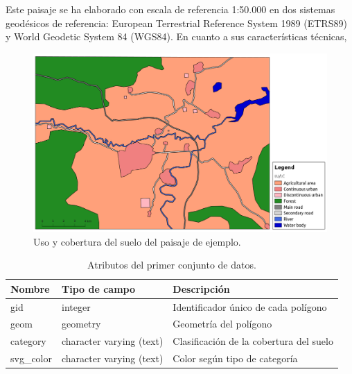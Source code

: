 Este paisaje se ha elaborado con escala de referencia 1:50.000 en dos sistemas geodésicos de referencia: European Terrestrial Reference System 1989 (ETRS89) y World Geodetic System 84 (WGS84). En cuanto a sus características técnicas, 



\begin{figure}
\begin{center}
\includegraphics[width=\textwidth]{Metodologia/Figs/land_test.png}
\caption{Uso y cobertura del suelo del paisaje de ejemplo. \label{fig:lan_test}}
\end{center}
\end{figure}

\begin{table}[]
\centering
\caption{Atributos del primer conjunto de datos.}
\label{my-label}
\begin{tabular}{@{}lll@{}}
\toprule
\textbf{Nombre} & \textbf{Tipo de campo}   & \textbf{Descripción}                    \\ \midrule
gid             & integer                  & Identificador único de cada polígono    \\
geom            & geometry                 & Geometría del polígono                  \\
category        & character varying (text) & Clasificación de la cobertura del suelo \\
svg\_color      & character varying (text) & Color según tipo de categoría           \\ \bottomrule
\end{tabular}
\end{table}





